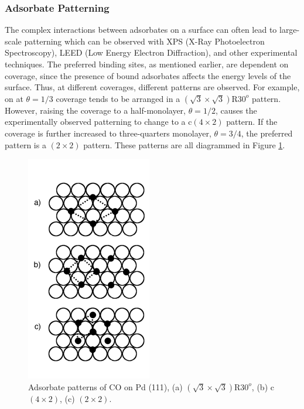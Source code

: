 \subsubsection{Adsorbate Patterning}
The complex interactions between adsorbates on a surface can often lead to
large-scale patterning which can be observed with XPS (X-Ray Photoelectron
Spectroscopy), LEED (Low Energy Electron Diffraction), and other experimental
techniques. The preferred binding sites, as mentioned earlier, are dependent on
coverage, since the presence of bound adsorbates affects the energy levels of
the surface. Thus, at different coverages, different patterns are observed. For
example,  on  at $\theta = 1/3$ coverage tends to be
arranged in a $(\sqrt{3}\times\sqrt{3})\textrm{R}30^o$ pattern. However, raising the coverage to a
half-monolayer, $\theta = 1/2$, causes the experimentally observed patterning to change to a c$(4\times2)$
pattern. If the coverage is further increased to three-quarters monolayer, $\theta = 3/4$, 
the preferred pattern is a $(2\times2)$ pattern.\citep{Guo:1989aa} These patterns are
all diagrammed in Figure \ref{fig:patterns}.

\begin{figure}[p!]
\centering
  \includegraphics[width=0.5\linewidth]{../figures/chap1/pattern.pdf}
  \caption{Adsorbate patterns of CO on Pd (111), (a)
$(\sqrt{3}\times\sqrt{3})\textrm{R}30^o$, (b) c$(4\times2)$, (c) $(2\times2)$.}
\label{fig:patterns}
\end{figure}

